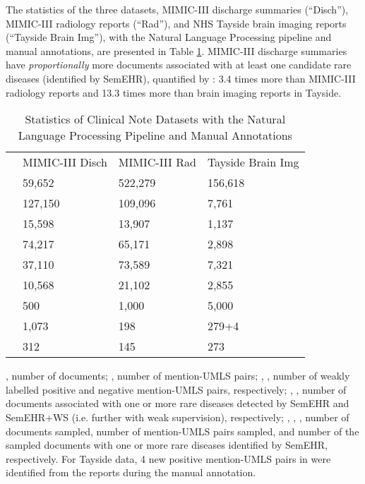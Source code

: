 \documentclass[twocolumn]{bmcart}
\begin{document}
The statistics of the three datasets, MIMIC-III discharge summaries (``Disch''), MIMIC-III radiology reports (``Rad''), and NHS Tayside brain imaging reports (``Tayside Brain Img''), with the Natural Language Processing pipeline and manual annotations, are presented in Table \ref{data-statistics}. MIMIC-III discharge summaries have \emph{proportionally} more documents associated with at least one candidate rare diseases (identified by SemEHR), quantified by : 3.4 times more than MIMIC-III radiology reports and 13.3 times more than brain imaging reports in Tayside.


\begin{table}[ht]
	\caption{Statistics of Clinical Note Datasets with the Natural Language Processing Pipeline and Manual Annotations}
	\center
	\scriptsize
	\label{data-statistics}
	\begin{threeparttable}
		\begin{tabular}{llll}
			\cline{1-4}
			& MIMIC-III Disch       & MIMIC-III Rad      & Tayside Brain Img          \\
			\cline{1-4}
			                   & 59,652              & 522,279           & 156,618           \\
			                   & 127,150             & 109,096           & 7,761               \\
			           & 15,598              & 13,907            & 1,137             \\
			           & 74,217              & 65,171            & 2,898             \\
			     & 37,110              & 73,589            & 7,321                      \\
			       & 10,568              & 21,102            & 2,855             \\
			\hline\hline
			             & 500                 & 1,000             & 5,000             \\
			             & 1,073               & 198               & 279+4             \\
			        & 312                 & 145               & 273               \\
			\cline{1-4}
		\end{tabular}
		\begin{tablenotes}
			\item , number of documents; , number of mention-UMLS pairs; , , number of weakly labelled positive and negative mention-UMLS pairs, respectively; , , number of documents associated with one or more rare diseases detected by SemEHR and SemEHR+WS (i.e. further with weak supervision), respectively; , , , number of documents sampled, number of mention-UMLS pairs sampled, and number of the sampled documents with one or more rare diseases identified by SemEHR, respectively. For Tayside data, 4 new positive mention-UMLS pairs in  were identified from the reports during the manual annotation.
		\end{tablenotes}
	\end{threeparttable}
\end{table}
\end{document}
